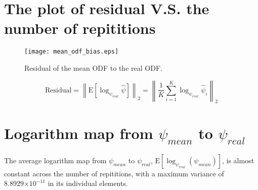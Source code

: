 \documentclass[10pt]{article}
\providecommand{\e}[1]{\ensuremath{\times 10^{#1}}}
\begin{document}
\section{The plot of residual V.S. the number of repititions}
\begin{figure}[H]
  \centering
  \texttt{[image: mean\_odf\_bias.eps]}
  \caption{Residual of the mean ODF to the real ODF.}
\end{figure}

\begin{equation}
\text{Residual}=\left\|\mathrm{E}[\log_{\psi_{real}}{\hat{\psi}}]\right\|_2
=\left\|\frac{1}{K}\sum_{i=1}^K\log_{\psi_{real}}{\hat{\psi}_i}\right\|_2
\end{equation}

\section{Logarithm map from $\psi_{mean}$ to $\psi_{real}$}

The average logarithm map from $\psi_{mean}$ to $\psi_{real}$, $\mathrm{E}\left[\log_{\psi_{real}}{(\psi_{mean})}\right]$, is almost constant across the number of repititions, with a maximum variance of $8.8929\e{-11}$ in its individual elements.\\
\end{document}
